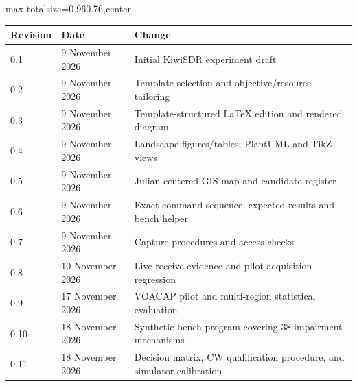 \documentclass[11pt,a4paper]{article}
\begin{document}
\begin{landscape}\thispagestyle{plain}\centering
\begin{adjustbox}{max totalsize={0.96\linewidth}{0.76\textheight},center}
\begin{tabular}{@{}lll@{}}
\toprule Revision & Date & Change\\\midrule
0.1 & 9 November 2026 & Initial KiwiSDR experiment draft\\
0.2 & 9 November 2026 & Template selection and objective/resource tailoring\\
0.3 & 9 November 2026 & Template-structured LaTeX edition and rendered diagram\\
0.4 & 9 November 2026 & Landscape figures/tables; PlantUML and TikZ views\\
0.5 & 9 November 2026 & Julian-centered GIS map and candidate register\\
0.6 & 9 November 2026 & Exact command sequence, expected results and bench helper\\
0.7 & 9 November 2026 & Capture procedures and access checks\\
0.8 & 10 November 2026 & Live receive evidence and pilot acquisition regression\\
0.9 & 17 November 2026 & VOACAP pilot and multi-region statistical evaluation\\
0.10 & 18 November 2026 & Synthetic bench program covering 38 impairment mechanisms\\
0.11 & 18 November 2026 & Decision matrix, CW qualification procedure, and simulator calibration\\\bottomrule
\end{tabular}
\end{adjustbox}
\end{landscape}
\end{document}

